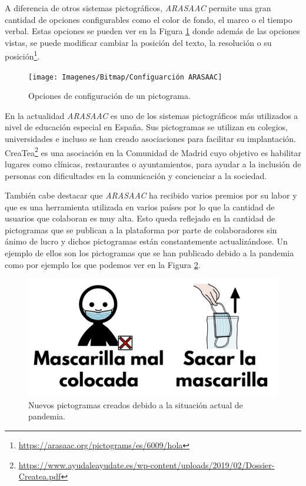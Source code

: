 A diferencia de otros sistemas pictográficos, \textit{ARASAAC} permite una gran cantidad de opciones configurables como el color de fondo, el marco o el tiempo verbal. Estas opciones se pueden ver en la Figura \ref{fig:configuarcion-arasaac} donde además de las opciones vistas, se puede modificar cambiar la posición del texto, la resolución o su posición\footnote{\url{https://arasaac.org/pictograms/es/6009/hola}}.



\begin{figure}[h!]
	\centering
	\texttt{[image: Imagenes/Bitmap/Configuarción ARASAAC]}
	\caption{Opciones de configuración de un pictograma.}
	\label{fig:configuarcion-arasaac}
\end{figure}



En la actualidad \textit{ARASAAC} es uno de los sistemas pictográficos más utilizados a nivel de educación especial en España. Sus pictogramas se utilizan en colegios, universidades e incluso se han creado asociaciones para facilitar su implantación. CreaTea\footnote{\url{https://www.ayudaleayudate.es/wp-content/uploads/2019/02/Dossier-Createa.pdf}} es una asociación en la Comunidad de Madrid cuyo objetivo es habilitar lugares como clínicas, restaurantes o ayuntamientos, para ayudar a la inclusión de personas con dificultades en la comunicación y concienciar a la sociedad.

También cabe destacar que \textit{ARASAAC} ha recibido varios premios por su labor y que es una herramienta utilizada en varios países por lo que la cantidad de usuarios que colaboran es muy alta. Esto queda reflejado en la cantidad de pictogramas que se publican a la plataforma por parte de colaboradores sin ánimo de lucro y dichos pictogramas están constantemente actualizándose. Un ejemplo de ellos son los pictogramas que se han publicado debido a la pandemia como por ejemplo los que podemos ver en la Figura \ref{fig:ejemplosdepictos}.


\begin{figure}[h!]
	\centering
	\includegraphics[width=0.7\linewidth]{Imagenes/Bitmap/ejemplosdepictos}
	\caption{Nuevos pictogramas creados debido a la situación actual de pandemia. }
	\label{fig:ejemplosdepictos}
\end{figure}




